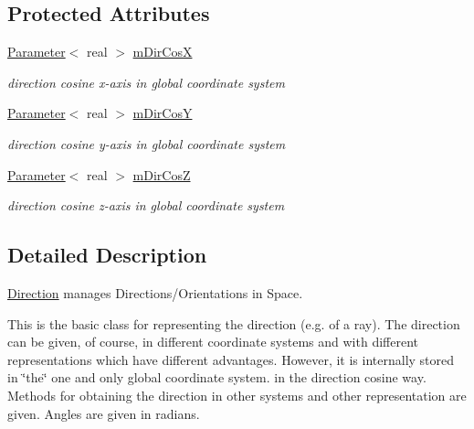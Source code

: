 \subsection*{Protected Attributes}
\begin{DoxyCompactItemize}
\item 
\hyperlink{classParameter}{Parameter}$<$ real $>$ \hyperlink{classDirection_a796f5d3ab9275f9711e8454c1852e8a3}{m\+Dir\+CosX}\hypertarget{classDirection_a796f5d3ab9275f9711e8454c1852e8a3}{}\label{classDirection_a796f5d3ab9275f9711e8454c1852e8a3}

\begin{DoxyCompactList}\small\item\em direction cosine x-\/axis in global coordinate system \end{DoxyCompactList}\item 
\hyperlink{classParameter}{Parameter}$<$ real $>$ \hyperlink{classDirection_a7a857846b71b40148a2058deeedd7c56}{m\+Dir\+CosY}\hypertarget{classDirection_a7a857846b71b40148a2058deeedd7c56}{}\label{classDirection_a7a857846b71b40148a2058deeedd7c56}

\begin{DoxyCompactList}\small\item\em direction cosine y-\/axis in global coordinate system \end{DoxyCompactList}\item 
\hyperlink{classParameter}{Parameter}$<$ real $>$ \hyperlink{classDirection_a15cd63604eccaaec032691871a316396}{m\+Dir\+CosZ}\hypertarget{classDirection_a15cd63604eccaaec032691871a316396}{}\label{classDirection_a15cd63604eccaaec032691871a316396}

\begin{DoxyCompactList}\small\item\em direction cosine z-\/axis in global coordinate system \end{DoxyCompactList}\end{DoxyCompactItemize}


\subsection{Detailed Description}
\hyperlink{classDirection}{Direction} manages Directions/\+Orientations in Space. 

This is the basic class for representing the direction (e.\+g. of a ray). The direction can be given, of course, in different coordinate systems and with different representations which have different advantages. However, it is internally stored in \char`\"{}the\char`\"{} one and only global coordinate system. in the direction cosine way. Methods for obtaining the direction in other systems and other representation are given. Angles are given in radians.

